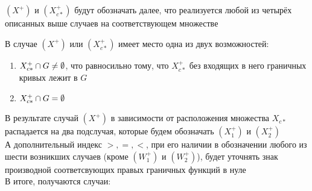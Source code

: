 \begin{notation}
    $ (X^+) $ и $ (X_{c*}^+) $ будут обозначать далее, что реализуется любой из четырёх описанных выше случаев на соответствующем множестве
\end{notation}

В случае $ (X^+) $ или $ (X_{c*}^+) $ имеет место одна из двух возможностей:
\begin{enumerate}
    \item $ X_{c*}^+ \cap G \ne \emptyset $, что равносильно тому, что $ X_{c*}^+ $ без входящих в него граничных кривых лежит в $ G $
    \item $ X_{c*}^+ \cap G = \emptyset $
\end{enumerate}

В результате случай $ (X^+) $ в зависимости от расположения множества $ X_{c*} $ распадается на два подслучая, которые будем обозначать $ (X_1^+) $ и $ (X_2^+) $ \\
А дополнительный индекс $ >, =, < $, при его наличии в обозначении любого из шести возникших случаев (кроме $ (W_1^+) $ и $ (W_2^+) $), будет уточнять знак производной соответсвующих правых граничных функций в нуле \\
В итоге, получаются случаи:
